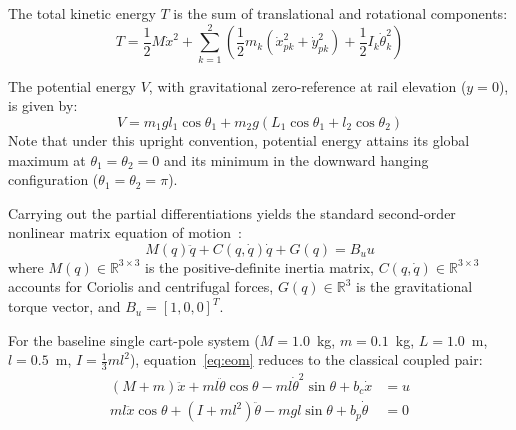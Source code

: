 \documentclass[conference]{IEEEtran}
\begin{document}
The total kinetic energy $T$ is the sum of translational and rotational components:
\begin{equation}
T = \frac{1}{2} M \dot{x}^2 + \sum_{k=1}^2 \left( \frac{1}{2} m_k (\dot{x}_{pk}^2 + \dot{y}_{pk}^2) + \frac{1}{2} I_k \dot{\theta}_k^2 \right)
\end{equation}

The potential energy $V$, with gravitational zero-reference at rail elevation ($y = 0$), is given by:
\begin{equation}
V = m_1 g l_1 \cos\theta_1 + m_2 g (L_1 \cos\theta_1 + l_2 \cos\theta_2)
\end{equation}
Note that under this upright convention, potential energy attains its global maximum at $\theta_1 = \theta_2 = 0$ and its minimum in the downward hanging configuration ($\theta_1 = \theta_2 = \pi$).

Carrying out the partial differentiations yields the standard second-order nonlinear matrix equation of motion~\cite{ref_brunton}:
\begin{equation}
M(q)\ddot{q} + C(q, \dot{q})\dot{q} + G(q) = B_u u
\label{eq:eom}
\end{equation}
where $M(q) \in \mathbb{R}^{3\times 3}$ is the positive-definite inertia matrix, $C(q, \dot{q}) \in \mathbb{R}^{3\times 3}$ accounts for Coriolis and centrifugal forces, $G(q) \in \mathbb{R}^3$ is the gravitational torque vector, and $B_u = [1, 0, 0]^T$.

For the baseline single cart-pole system ($M=1.0$~kg, $m=0.1$~kg, $L=1.0$~m, $l=0.5$~m, $I = \frac{1}{3}ml^2$), equation~\eqref{eq:eom} reduces to the classical coupled pair:
\begin{align}
(M + m)\ddot{x} + m l \ddot{\theta}\cos\theta - m l \dot{\theta}^2 \sin\theta + b_c \dot{x} &= u \\
m l \ddot{x}\cos\theta + (I + m l^2)\ddot{\theta} - m g l \sin\theta + b_p \dot{\theta} &= 0
\end{align}
\end{document}
